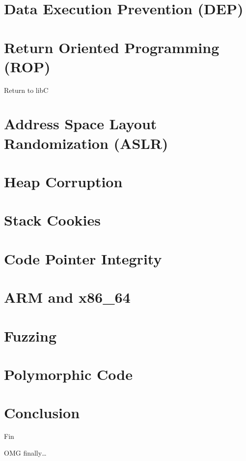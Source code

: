 \documentclass[beamer]{uibk}
\begin{document}
\section{Data Execution Prevention (DEP)}

\section{Return Oriented Programming (ROP)}

\begin{frame}{Return to libC}

\end{frame}

\section{Address Space Layout Randomization (ASLR)}

\section{Heap Corruption}

\section{Stack Cookies}

\section{Code Pointer Integrity}

\section{ARM and x86\_64}

\section{Fuzzing}

\section{Polymorphic Code}

\section*{Conclusion}

\begin{frame}{Fin}
   \begin{center}
       \huge OMG finally\dots
   \end{center}
\end{frame}
\end{document}
